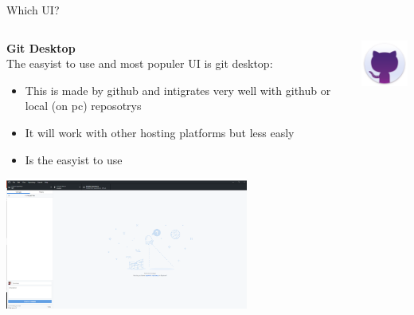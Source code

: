 \documentclass[10pt]{beamer}
\begin{document}
\begin{frame}[fragile]{Which UI?}
  \begin{columns}[T]
    \begin{column}{.8\textwidth}
  	\textbf{Git Desktop\\}
	The easyist to use and most populer UI is git desktop:
	\begin{itemize}
		\item This is made by github and intigrates very well with github or local (on pc) reposotrys
		\item It will work with other hosting platforms but less easly
		\item Is the easyist to use
	\end{itemize}
	\includegraphics[width=8cm]{Figs/GHD/outline_02}
    \end{column}
    \begin{column}{.2\textwidth}
	\includegraphics[width=2cm]{Figs/git/gitdesktop} \newline  \newline  \newline 
    \end{column}
  \end{columns}
\end{frame}
\end{document}
